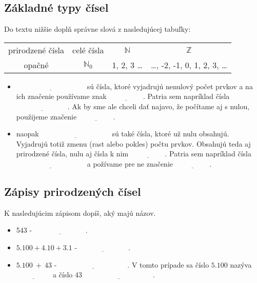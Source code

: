 \documentclass[12pt]{article}
\begin{document}
	\subsection{Základné typy čísel}
	Do textu nižšie doplň správne slová z nasledujúcej tabuľky:
	\newline
	\begin{table}[!hbt]
		\centering
		\begin{tabular}{|cccc|}
			
			\hline
			prirodzené čísla &celé čísla &$\mathbb{N}$ &$\mathbb{Z}$ \\
			opačné &$\mathbb{N}_0$ &1, 2, 3 \dots &\dots, -2, -1, 0, 1, 2, 3, \dots\\
			
			\hline
			
		\end{tabular}
	\end{table}
	\begin{itemize}
		\item $\underline{\hspace{4cm}}$ sú čísla, ktoré vyjadrujú nenulový počet prvkov a na ich značenie používame znak $\underline{\hspace{2cm}}$. Patria sem napríklad čísla $\underline{\hspace{3cm}}$. Ak by sme ale chceli dať najavo, že počítame aj s nulou, použijeme značenie $\underline{\hspace{2cm}}$.
		\item naopak $\underline{\hspace{4cm}}$ sú také čísla, ktoré už nulu obsahujú. Vyjadrujú totiž zmenu (rast alebo pokles)  počtu prvkov. Obsahujú teda aj prirodzené čísla, nulu aj čísla k nim $\underline{\hspace{2cm}}$. Patria sem napríklad čísla $\underline{\hspace{4cm}}$ a požívame pre ne značenie $\underline{\hspace{2cm}}$.
	\end{itemize}
	
	\subsection{Zápisy prirodzených čísel}
	K nasledujúcim zápisom dopíš, aký majú názov.
	
	\begin{itemize}
		\item 543 - $\underline{\hspace{3cm}}$.
		\item $5.100 + 4.10 + 3.1$ -$\underline{\hspace{3cm}}$.
		\item $5.100~ + ~43$ - $\underline{\hspace{4cm}}$. V tomto prípade sa číslo $5.100$ nazýva $\underline{\hspace{2cm}}$ a číslo 43 $\underline{\hspace{4cm}}$.
		
	\end{itemize}
	
\end{document}
